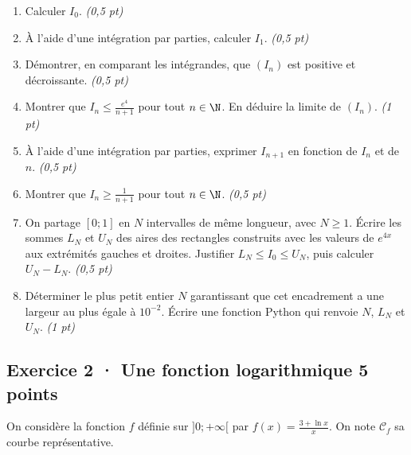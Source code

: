 \begin{enumerate}

\item Calculer $I_0$. \hfill\textit{(0,5 pt)}

\item À l'aide d'une intégration par parties, calculer $I_1$. \hfill\textit{(0,5 pt)}

\item Démontrer, en comparant les intégrandes, que $(I_n)$ est positive et décroissante. \hfill\textit{(0,5 pt)}

\item Montrer que $I_n\le\frac{e^{4}}{n+1}$ pour tout $n\in\N$. En déduire la limite de $(I_n)$. \hfill\textit{(1 pt)}

\item À l'aide d'une intégration par parties, exprimer $I_{n+1}$ en fonction de $I_n$ et de $n$. \hfill\textit{(0,5 pt)}

\item Montrer que $I_n\ge\frac1{n+1}$ pour tout $n\in\N$. \hfill\textit{(0,5 pt)}

\item On partage $[0;1]$ en $N$ intervalles de même longueur, avec $N\ge1$. Écrire les sommes $L_N$ et $U_N$ des aires des rectangles construits avec les valeurs de $e^{4x}$ aux extrémités gauches et droites. Justifier $L_N\le I_0\le U_N$, puis calculer $U_N-L_N$. \hfill\textit{(0,5 pt)}

\item Déterminer le plus petit entier $N$ garantissant que cet encadrement a une largeur au plus égale à $10^{-2}$. Écrire une fonction Python qui renvoie $N$, $L_N$ et $U_N$. \hfill\textit{(1 pt)}

\end{enumerate}

\subsection*{Exercice 2 · Une fonction logarithmique \hfill 5 points}On considère la fonction $f$ définie sur $]0;+\infty[$ par $f(x)=\frac{3+\ln x}x$. On note $\mathcal C_f$ sa courbe représentative.

